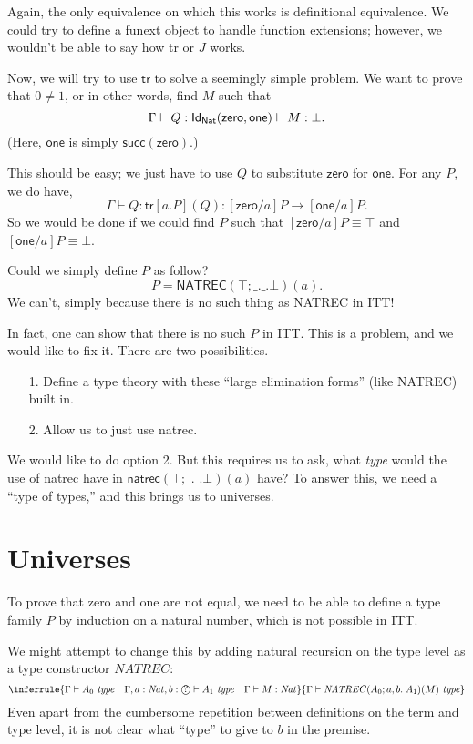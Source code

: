 \documentclass{article} \usepackage{chtt-notes} \usepackage{stmaryrd}
\newcommand{\entails}{\vdash}
\newcommand{\G}{\Gamma}
\newcommand{\atype}[1]{#1~\mathit{type}}
\newcommand{\Nat}{\mathit{Nat}}
\newcommand{\circled}[1]{\text{\textcircled{#1}}}
\newcommand{\tr}{\textsf{tr}}
\newcommand{\one}{\textsf{one}}
\newcommand{\zero}{\textsf{zero}}
\begin{document}
Again, the only equivalence on which this works is definitional equivalence.
We could try to define a \textsf{funext} object to handle function extensions; however,
we wouldn't be able to say how \textsf{tr} or $J$ works.

Now, we will try to use $\tr$ to solve a seemingly simple problem. We want to prove that
$0 \ne 1$, or in other words, find $M$ such that
\[
  \G \entails Q : \Id{\textsf{Nat}}{\zero}{\one} \entails M : \bot.
\]
(Here, $\one$ is simply $\textsf{succ}(\zero)$.)

This should be easy; we just have to use $Q$ to substitute $\zero$ for $\one$.
For any $P$, we do have,
\[
  \G \entails Q : \tr[a.P](Q) : [\zero / a]P \to [\one / a]P.
\]
So we would be done if we could find $P$ such that $[\zero / a]P \equiv \top$ and $[\one / a]P \equiv \bot$.

Could we simply define $P$ as follow?
\[ 
  P = \textsf{NATREC}(\top; \_.\_. \bot)(a).
\]
We can't, simply because there is no such thing as \textsf{NATREC} in ITT!

In fact, one can show that there is no such $P$ in ITT. This is a problem, and we would like
to fix it. There are two possibilities.
\begin{enumerate}
\item[1.] Define a type theory with these ``large elimination forms'' (like \textsf{NATREC}) built in.
\item[2.] Allow us to just use \textsf{natrec}.
\end{enumerate}

We would like to do option 2. But this requires us to ask, what \emph{type} would the
use of \textsf{natrec} have in
$\textsf{natrec}(\top; \_.\_. \bot)(a)$ have? To answer this, we need a ``type of types,''
and this brings us to universes.
  
\section{Universes}%
%
To prove that zero and one are not equal, we need to be able to define a type family $P$ by induction on a natural number, which is not possible in ITT.

We might attempt to change this by adding natural recursion on the type level as a type constructor $\mathit{NATREC}$:
\[ \inferrule{\G \entails \atype{A_0} \quad \G, a: \Nat, b: \circled{?} \entails \atype{A_1} \quad \G \entails M : \Nat}{\G \entails \atype{\mathit{NATREC}(A_0; a,b.\; A_1)(M)}} \]
Even apart from the cumbersome repetition between definitions on the term and type level, it is not clear what ``type'' to give to $b$ in the premise.
\end{document}
